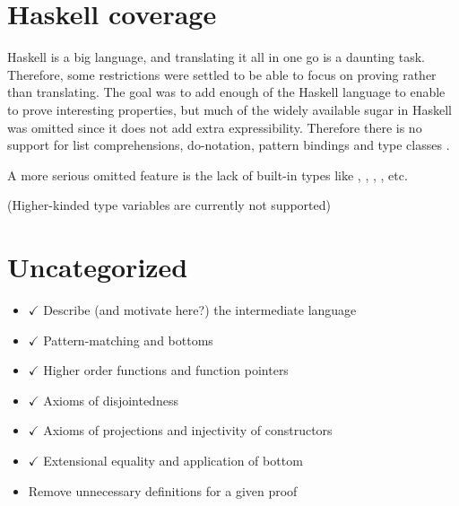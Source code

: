 \section{Haskell coverage}

Haskell is a big language, and translating it all in one go is a
daunting task. Therefore, some restrictions were settled to be able to
focus on proving rather than translating.
The goal was to add enough of the Haskell language to enable to prove
interesting properties, but much of the widely available sugar in
Haskell was omitted since it does not add extra
expressibility. Therefore there is no support for
list comprehensions, do-notation, pattern bindings and type classes .

A more serious omitted feature is the lack of built-in types like ,
, , , etc.

(Higher-kinded type variables are currently not supported)

\section{Uncategorized}

\begin{itemize}

\item $\checkmark$ Describe (and motivate here?) the intermediate language

\item $\checkmark$ Pattern-matching and bottoms

\item $\checkmark$ Higher order functions and function pointers

\item $\checkmark$ Axioms of disjointedness

\item $\checkmark$ Axioms of projections and injectivity of constructors

\item $\checkmark$ Extensional equality and application of bottom

\item Remove unnecessary definitions for a given proof

\end{itemize}